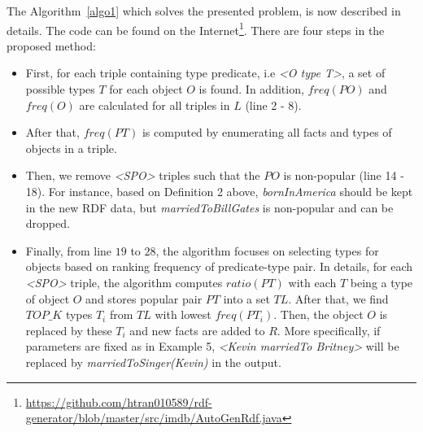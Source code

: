 \documentclass{acm_proc_article-sp}
\begin{document}
The Algorithm~\ref{algo1} which solves the presented problem, is now described in details. The code can be found on the Internet\footnote{\url{https://github.com/htran010589/rdf-generator/blob/master/src/imdb/AutoGenRdf.java}}. There are four steps in the proposed method:
\begin{itemize}
\item First, for each triple containing type predicate, i.e \textit{<O type T>}, a set of possible types $T$ for each object $O$ is found. In addition, $freq(PO)$ and $freq(O)$ are calculated for all triples in $L$ (line 2 - 8).
\item After that, $freq(PT)$ is computed by enumerating all facts and types of objects in a triple.
\item Then, we remove \textit{<SPO>} triples such that the $PO$ is non-popular (line 14 - 18). For instance, based on Definition 2 above, \textit{bornInAmerica} should be kept in the new RDF data, but \textit{marriedToBillGates} is non-popular and can be dropped.
\item Finally, from line $19$ to $28$, the algorithm focuses on selecting types for objects based on ranking frequency of predicate-type pair. In details, for each \textit{<SPO>} triple, the algorithm computes $ratio(PT)$ with each $T$ being a type of object $O$ and stores popular pair $PT$ into a set $TL$. After that, we find $TOP\_K$ types $T_{i}$ from $TL$ with lowest $freq(PT_{i})$. Then, the object $O$ is replaced by these $T_{i}$ and new facts are added to $R$. More specifically, if parameters are fixed as in Example 5, \textit{<Kevin marriedTo Britney>} will be replaced by \textit{marriedToSinger(Kevin)} in the output.
\end{itemize}
\end{document}
